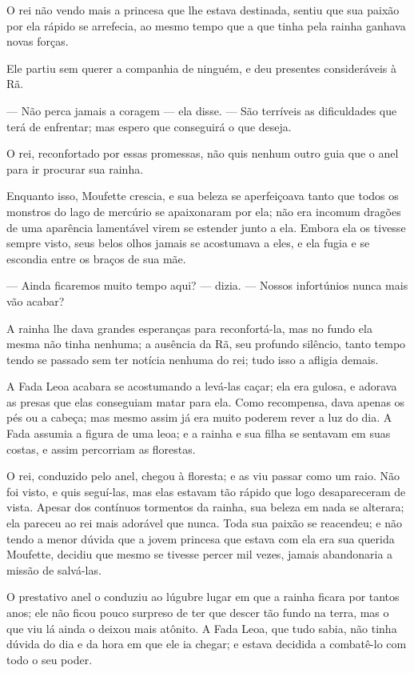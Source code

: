 O rei não vendo mais a princesa que lhe estava destinada, sentiu que
sua paixão por ela rápido se arrefecia, ao mesmo tempo que a que
tinha pela rainha ganhava novas forças.

Ele partiu sem querer a companhia de ninguém, e deu presentes
consideráveis à Rã. 

— Não perca jamais a coragem — ela disse. — São terríveis as
dificuldades que terá de enfrentar; mas espero que conseguirá o que
deseja. 

O rei, reconfortado por essas promessas, não quis nenhum outro guia
que o anel para ir procurar sua rainha. 

Enquanto isso, Moufette crescia, e sua beleza se aperfeiçoava tanto
que todos os monstros do lago de mercúrio se apaixonaram por ela; não
era incomum dragões de uma aparência lamentável virem se estender
junto a ela. Embora ela os tivesse sempre visto, seus belos olhos
jamais se acostumava a eles, e ela fugia e se escondia entre os
braços de sua mãe. 

— Ainda ficaremos muito tempo aqui? — dizia. — Nossos infortúnios
nunca mais vão acabar? 

A rainha lhe dava grandes esperanças para reconfortá-la, mas no fundo
ela mesma não tinha nenhuma; a ausência da Rã, seu profundo silêncio,
tanto tempo tendo se passado sem ter notícia nenhuma do rei; tudo
isso a afligia demais. 

A Fada Leoa acabara se acostumando a levá-las caçar; ela era gulosa, e
adorava as presas que elas conseguiam matar para ela. Como
recompensa, dava apenas os pés ou a cabeça; mas mesmo assim já era
muito poderem rever a luz do dia. A Fada assumia a figura de uma
leoa; e a rainha e sua filha se sentavam em suas costas, e assim
percorriam as florestas.

O rei, conduzido pelo anel, chegou à floresta; e as viu passar como um
raio. Não foi visto, e quis seguí-las, mas elas estavam tão rápido
que logo desapareceram de vista. Apesar dos contínuos tormentos da
rainha, sua beleza em nada se alterara; ela pareceu ao rei mais
adorável que nunca. Toda sua paixão se reacendeu; e não tendo a menor
dúvida que a jovem princesa que estava com ela era sua querida
Moufette, decidiu que mesmo se tivesse percer mil vezes, jamais
abandonaria a missão de salvá-las.

O prestativo anel o conduziu ao lúgubre lugar em que a rainha ficara
por tantos anos; ele não ficou pouco surpreso de ter que descer tão
fundo na terra, mas o que viu lá ainda o deixou mais atônito. A Fada
Leoa, que tudo sabia, não tinha dúvida do dia e da hora em que ele ia
chegar; e estava decidida a combatê-lo com todo o seu poder.

